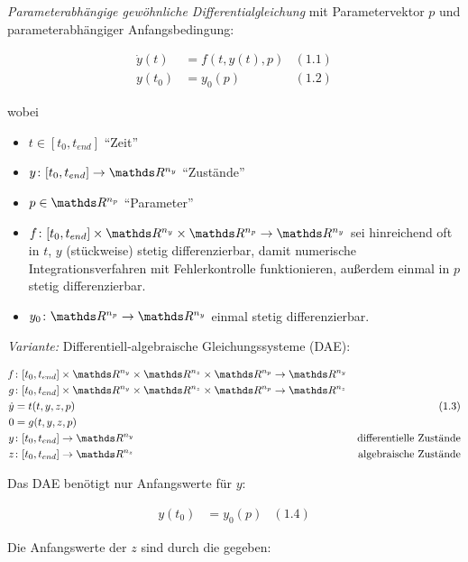 
\emph{Parameterabhängige gewöhnliche Differentialgleichung} mit Parametervektor $p$ und parameterabhängiger Anfangsbedingung:

\begin{align*}
\dot y(t) &= f(t,y(t),p) & (1.1) \\
y(t_0) &= y_0(p) & (1.2)
\end{align*}

wobei

\begin{itemize}
\item $t \in [t_0,t_{end}]$ "`Zeit"'
\item $y\colon [t_0,t_{end}] \to \R^{n_y}$ "`Zustände"'
\item $p \in \R^{n_p}$ "`Parameter"'
\item $f\colon [t_0,t_{end}] \times \R^{n_y} \times \R^{n_p} \to \R^{n_y}$ sei hinreichend oft in $t$, $y$ (stückweise) stetig differenzierbar, damit numerische Integrationsverfahren mit Fehlerkontrolle funktionieren, außerdem einmal in $p$ stetig differenzierbar.
\item $y_0\colon \R^{n_p} \to \R^{n_y}$ einmal stetig differenzierbar.
\end{itemize}

\emph{Variante: } Differentiell-algebraische Gleichungssysteme (DAE):

\begin{align*}
f&\colon [t_0,t_{end}] \times \R^{n_y} \times \R^{n_z} \times \R^{n_p} \to \R^{n_y} & \\
g&\colon [t_0,t_{end}] \times \R^{n_y} \times \R^{n_z} \times \R^{n_p} \to \R^{n_z} & \\
\dot y &= t(t,y,z,p) & (1.3)\\
0 &= g(t,y,z,p) \\
y &\colon [t_0,t_{end}] \to \R^{n_y} & \text{differentielle Zustände} \\
z &\colon [t_0,t_{end}] \to \R^{n_z} & \text{algebraische Zustände} \\
\end{align*}

Das DAE benötigt nur Anfangswerte für $y$:

\begin{align*}
y(t_0) &= y_0(p) & (1.4)
\end{align*}

Die Anfangswerte der $z$ sind durch die  gegeben:

